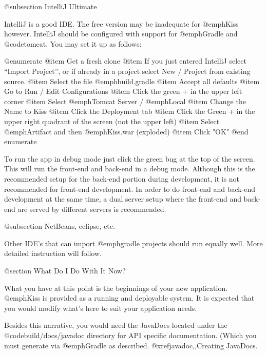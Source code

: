 @subsection IntelliJ Ultimate

IntelliJ is a good IDE.  The free version may be inadequate for
@emph{Kiss} however.  IntelliJ should be configured with support for
@emph{Gradle} and @code{tomcat}.  You may set it up as follows:

@enumerate
@item
Get a fresh clone
@item
If you just entered IntelliJ select ``Import Project'', or if already in a project select New / Project from existing source.
@item
Select the file @emph{build.gradle}
@item
Accept all defaults
@item
Go to Run / Edit Configurations
@item
Click the green + in the upper left corner
@item
Select @emph{Tomcat Server} / @emph{Local}
@item
Change the Name to Kiss
@item
Click the Deployment tab
@item
Click the Green + in the upper right quadrant of the screen (not the upper left)
@item
Select @emph{Artifact} and then @emph{Kiss.war} (exploded)
@item
Click "OK"
@end enumerate

To run the app in debug mode just click the green bug at the top of the screen.  This will run the front-end and back-end 
in a debug mode.  Although this is the recommended setup for the back-end portion during development, it is not recommended
for front-end development.  In order to do front-end and back-end development at the same time, a dual server setup where
the front-end and back-end are served by different servers is recommended.  

@subsection NetBeans, eclipse, etc.

Other IDE's that can import @emph{gradle} projects should run equally well.  More detailed instruction will follow.

@section What Do I Do With It Now?

What you have at this point is the beginnings of your new application.
@emph{Kiss} is provided as a running and deployable system.  It is
expected that you would modify what's here to suit your application
needs.

Besides this narrative, you would need the JavaDocs located under the
@code{build/docs/javadoc} directory for API specific documentation.
(Which you must generate via @emph{Gradle} as described. @xref{javadoc,,Creating JavaDocs}.
